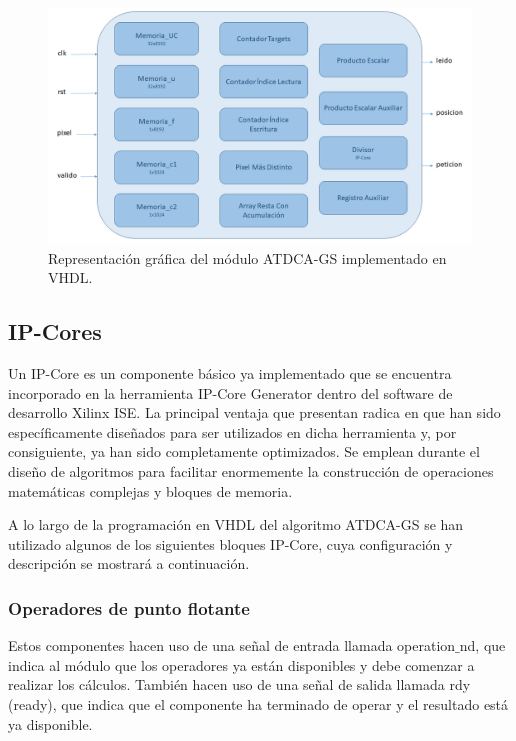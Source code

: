\begin{figure}
  \centering
    \includegraphics[width=1\textwidth]{Imagenes/DiagramaModuloATDCA-GS.png}
  \caption{Representación gráfica del módulo ATDCA-GS implementado en VHDL.}
  \label{fig:modulo atdca-gs vhdl}
\end{figure}

\subsection{IP-Cores}

Un IP-Core es un componente básico ya implementado que se encuentra incorporado en la herramienta IP-Core Generator dentro del software de desarrollo Xilinx ISE. La principal ventaja que presentan radica en que han sido específicamente diseñados para ser utilizados en dicha herramienta y, por consiguiente, ya han sido completamente optimizados. Se emplean durante el diseño de algoritmos para facilitar enormemente la construcción de operaciones matemáticas complejas y bloques de memoria.

A lo largo de la programación en VHDL del algoritmo ATDCA-GS se han utilizado algunos de los siguientes bloques IP-Core, cuya configuración y descripción se mostrará a continuación.

\subsubsection{Operadores de punto flotante}

Estos componentes hacen uso de una señal de entrada llamada operation$\_$nd, que indica al módulo que los operadores ya están disponibles y debe comenzar a realizar los cálculos. También hacen uso de una señal de salida llamada rdy (ready), que indica que el componente ha terminado de operar y el resultado está ya disponible.

